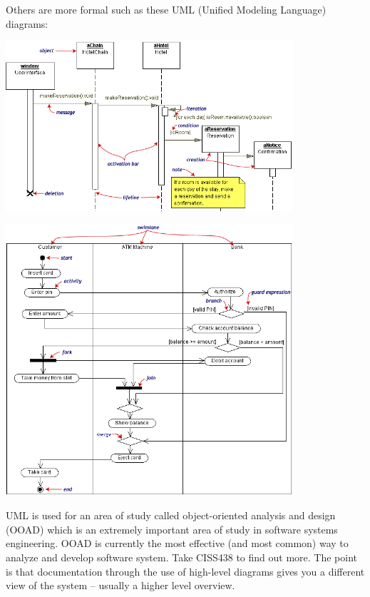 Others are more formal such as these UML (Unified Modeling Language)
diagrams:

\includegraphics[width=0.8\textwidth]{2.png}

\includegraphics[width=0.8\textwidth]{3.png}

UML is used for an area of study called object-oriented analysis and
design (OOAD) which is an extremely important area of study in software
systems engineering. OOAD is currently the most effective (and most
common) way to analyze and develop software system. Take CISS438
to find out more.
The point is that documentation through the use of high-level diagrams
gives you a different view of the system – usually a higher level overview.


